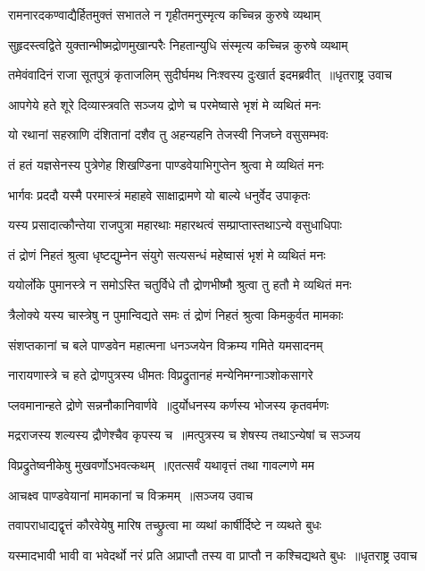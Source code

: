 \twolineshloka
{रामनारदकण्वाद्यैर्हितमुक्तं सभातले}
{न गृहीतमनुस्मृत्य कच्चिन्न कुरुषे व्यथाम्}


\twolineshloka
{सुहृदस्त्वद्विते युक्तान्भीष्मद्रोणमुखान्परैः}
{निहतान्युधि संस्मृत्य कच्चिन्न कुरुषे व्यथाम्}


\threelineshloka
{तमेवंवादिनं राजा सूतपुत्रं कृताजलिम्}
{सुदीर्घमथ निःश्वस्य दुःखार्त इदमब्रवीत् ॥धृतराष्ट्र उवाच}
{}


\twolineshloka
{आपगेये हते शूरे दिव्यास्त्रवति सञ्जय}
{द्रोणे च परमेष्वासे भृशं मे व्यथितं मनः}


\twolineshloka
{यो रथानां सहस्राणि दंशितानां दशैव तु}
{अहन्यहनि तेजस्वी निजघ्ने वसुसम्भवः}


\twolineshloka
{तं हतं यज्ञसेनस्य पुत्रेणेह शिखण्डिना}
{पाण्डवेयाभिगुप्तेन श्रुत्वा मे व्यथितं मनः}


\twolineshloka
{भार्गवः प्रददौ यस्मै परमास्त्रं महाहवे}
{साक्षाद्रामणे यो बाल्ये धनुर्वेद उपाकृतः}


\twolineshloka
{यस्य प्रसादात्कौन्तेया राजपुत्रा महारथाः}
{महारथत्वं सम्प्राप्तास्तथाऽन्ये वसुधाधिपाः}


\twolineshloka
{तं द्रोणं निहतं श्रुत्वा धृष्टद्युम्नेन संयुगे}
{सत्यसन्धं महेष्वासं भृशं मे व्यथितं मनः}


\twolineshloka
{ययोर्लोके पुमानस्त्रे न समोऽस्ति चतुर्विधे}
{तौ द्रोणभीष्मौ श्रुत्वा तु हतौ मे व्यथितं मनः}


\twolineshloka
{त्रैलोक्ये यस्य चास्त्रेषु न पुमान्विद्यते समः}
{तं द्रोणं निहतं श्रुत्वा किमकुर्वत मामकाः}


\twolineshloka
{संशप्तकानां च बले पाण्डवेन महात्मना}
{धनञ्जयेन विक्रम्य गमिते यमसादनम्}


\threelineshloka
{नारायणास्त्रे च हते द्रोणपुत्रस्य धीमतः}
{विप्रद्रुतानहं मन्येनिमग्नाञ्शोकसागरे}
{}


\twolineshloka
{प्लवमानान्हते द्रोणे सन्ननौकानिवार्णवे ॥दुर्योधनस्य कर्णस्य भोजस्य कृतवर्मणः}
{}


\twolineshloka
{मद्रराजस्य शल्यस्य द्रौणेश्चैव कृपस्य च ॥मत्पुत्रस्य च शेषस्य तथाऽन्येषां च सञ्जय}
{}


\twolineshloka
{विप्रद्रुतेष्वनीकेषु मुखवर्णोऽभवत्कथम् ॥एतत्सर्वं यथावृत्तं तथा गावल्गणे मम}
{}


\twolineshloka
{आचक्ष्व पाण्डवेयानां मामकानां च विक्रमम् ॥सञ्जय उवाच}
{}


\twolineshloka
{तवापराधाद्यद्वृत्तं कौरवेयेषु मारिष}
{तच्छ्रुत्वा मा व्यथां कार्षीर्दिष्टे न व्यथते बुधः}


\threelineshloka
{यस्मादभावी भावी वा भवेदर्थो नरं प्रति}
{अप्राप्तौ तस्य वा प्राप्तौ न कश्चिद्यथते बुधः ॥धृतराष्ट्र उवाच}
{}


